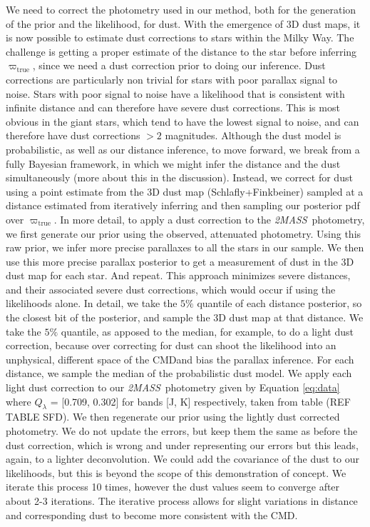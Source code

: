 \documentclass[modern]{aastex61}
\newcommand{\acronym}[1]{{\small{#1}}}
\newcommand{\project}[1]{\textsl{#1}}
\newcommand{\tmass}{\project{\acronym{2MASS}}}
\newcommand{\cmd}{\acronym{CMD}}
\newcommand{\true}{\mathrm{true}}
\begin{document}
We need to correct the photometry used in our method, both for the generation of the prior and the likelihood, for dust. With the emergence of 3D dust maps, it is now possible to estimate dust corrections to stars within the Milky Way. The challenge is getting a proper estimate of the distance to the star before inferring $\varpi_{\true}$, since we need a dust correction prior to doing our inference. Dust corrections are particularly non trivial for stars with poor parallax signal to noise. Stars with poor signal to noise have a likelihood that is consistent with infinite distance and can therefore have severe dust corrections. This is most obvious in the giant stars, which tend to have the lowest signal to noise, and can therefore have dust corrections $> 2$ magnitudes. Although the dust model is probabilistic, as well as our distance inference, to move forward, we break from a fully Bayesian framework, in which we might infer the distance and the dust simultaneously (more about this in the discussion). Instead, we correct for dust using a point estimate from the 3D dust map (Schlafly+Finkbeiner) sampled at a distance estimated from iteratively inferring and then sampling our posterior pdf over $\varpi_{\true}$. In more detail, to apply a dust correction to the \tmass\ photometry, we first generate our prior using the observed, attenuated photometry. Using this raw prior, we infer more precise parallaxes to all the stars in our sample. We then use this more precise parallax posterior to get a measurement of dust in the 3D dust map for each star. And repeat. This approach minimizes severe distances, and their associated severe dust corrections, which would occur if using the likelihoods alone. In detail, we take the $5\%$ quantile of each distance posterior, so the closest bit of the posterior, and sample the 3D dust map at that distance. We take the $5\%$ quantile, as apposed to the median, for example, to do a light dust correction, because over correcting for dust can shoot the likelihood into an unphysical, different space of the \cmd and bias the parallax inference. For each distance, we sample the median of the probabilistic dust model. We apply each light dust correction to our \tmass\ photometry given by Equation \ref{eq:data} where $Q_{\lambda}$ = [0.709, 0.302] for bands [J, K] respectively, taken from table (REF TABLE SFD). We then regenerate our prior using the lightly dust corrected photometry. We do not update the errors, but keep them the same as before the dust correction, which is wrong and under representing our errors but this leads, again, to a lighter deconvolution. We could add the covariance of the dust to our likelihoods, but this is beyond the scope of this demonstration of concept. We iterate this process 10 times, however the dust values seem to converge after about 2-3 iterations. The iterative process allows for slight variations in distance and corresponding dust to become more consistent with the \cmd.
\end{document}
